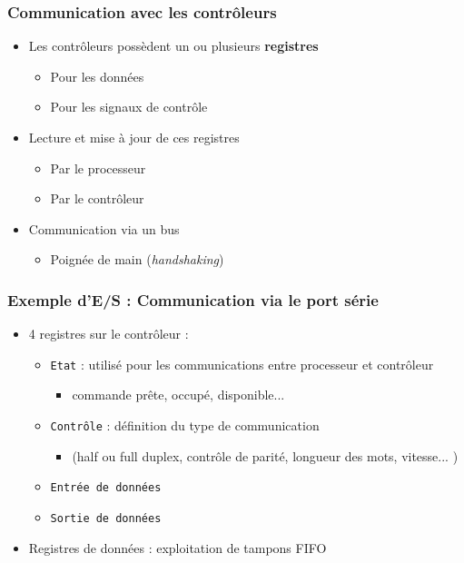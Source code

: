 \begin{frame}
\frametitle{Communication avec les contrôleurs}
\begin{itemize}
\item Les contrôleurs possèdent un ou plusieurs \textbf{registres}
\begin{itemize}
\item Pour les données
\item Pour les signaux de contrôle
\end{itemize}
\item Lecture et mise à jour de ces registres
\begin{itemize}
\item Par le processeur
\item Par le contrôleur
\end{itemize}
\item Communication via un bus
\begin{itemize}
\item Poignée de main (\textit{handshaking})
\end{itemize}
\end{itemize}
\end{frame}

\begin{frame}
\frametitle{Exemple d'E/S : Communication via le port série}
\begin{itemize}
\item 4 registres sur le contrôleur :
\begin{itemize}
\item \texttt{Etat} : utilisé pour les communications entre processeur et contrôleur
\begin{itemize}
  \item commande prête, occupé, disponible...
\end{itemize}
\item \texttt{Contrôle} : définition du type de communication
\begin{itemize}
\item (half ou full duplex, contrôle de parité, longueur des mots, vitesse... )
\end{itemize}
\item \texttt{Entrée de données}
\item \texttt{Sortie de données}
\end{itemize}
\item Registres de données : exploitation de tampons FIFO
\end{itemize}
\end{frame}

